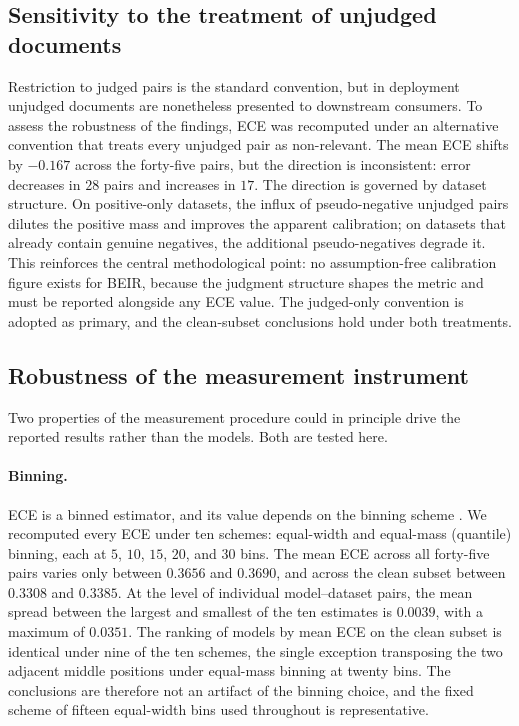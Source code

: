 \documentclass[sn-mathphys-num,pdflatex]{sn-jnl}
\begin{document}
\subsection{Sensitivity to the treatment of unjudged
documents}\label{sec:sensitivity}
Restriction to judged pairs is the standard convention, but in deployment unjudged
documents are nonetheless presented to downstream consumers. To assess the
robustness of the findings, ECE was recomputed under an alternative convention
that treats every unjudged pair as non-relevant. The mean ECE shifts by $-0.167$
across the forty-five pairs, but the direction is inconsistent: error decreases in
$28$ pairs and increases in $17$. The direction is governed by dataset structure.
On positive-only datasets, the influx of pseudo-negative unjudged pairs dilutes
the positive mass and improves the apparent calibration; on datasets that already
contain genuine negatives, the additional pseudo-negatives degrade it. This
reinforces the central methodological point: no assumption-free calibration figure
exists for BEIR, because the judgment structure shapes the metric and must be
reported alongside any ECE value. The judged-only convention is adopted as
primary, and the clean-subset conclusions hold under both treatments.

\subsection{Robustness of the measurement
instrument}\label{sec:robustness}
Two properties of the measurement procedure could in principle drive the reported
results rather than the models. Both are tested here.

\paragraph{Binning.}
ECE is a binned estimator, and its value depends on the binning scheme
\cite{nixon2019,roelofs2022}. We recomputed every ECE under ten schemes: equal-width
and equal-mass (quantile) binning, each at $5$, $10$, $15$, $20$, and $30$ bins. The
mean ECE across all forty-five pairs varies only between $0.3656$ and $0.3690$, and
across the clean subset between $0.3308$ and $0.3385$. At the level of individual
model--dataset pairs, the mean spread between the largest and smallest of the ten
estimates is $0.0039$, with a maximum of $0.0351$. The ranking of models by mean ECE
on the clean subset is identical under nine of the ten schemes, the single exception
transposing the two adjacent middle positions under equal-mass binning at twenty
bins. The conclusions are therefore not an artifact of the binning choice, and the
fixed scheme of fifteen equal-width bins used throughout is representative.
\end{document}
